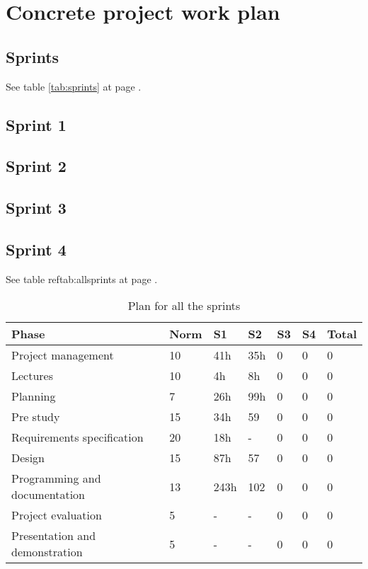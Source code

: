 

\section{Concrete project work plan}

\subsection*{Sprints}
See table \ref{tab:sprints} at page \pageref{tab:sprints}.

\subsection{Sprint 1}


\subsection{Sprint 2}


\subsection{Sprint 3}

\subsection{Sprint 4}


See table ref{tab:allsprints} at page \pageref{tab:allsprints}.
\begin{table}
\begin{tabular}{l|l|l|l|l|l|l}
\textbf{Phase} &  \textbf{Norm} & \textbf{S1} & \textbf{S2}  & \textbf{S3} & \textbf{S4} & \textbf{Total} \\ \hline \hline
Project management & 10 & 41h & 35h & 0 & 0 & 0\\ \hline
Lectures & 10 & 4h & 8h & 0 & 0 & 0\\ \hline
Planning & 7 & 26h & 99h & 0 & 0 & 0\\ \hline
Pre study & 15 & 34h & 59 & 0 & 0 & 0\\ \hline
Requirements specification & 20 & 18h & - & 0 & 0 & 0\\ \hline
Design & 15 & 87h & 57 & 0 & 0 & 0\\ \hline
Programming and documentation & 13 & 243h & 102 & 0 & 0 & 0\\ \hline
Project evaluation & 5 & - & - & 0 & 0 & 0\\ \hline
Presentation and demonstration & 5 & - & - & 0 & 0 & 0
\end{tabular}
\caption{Plan for all the sprints} \label{tab:allsprints}
\end{table}

